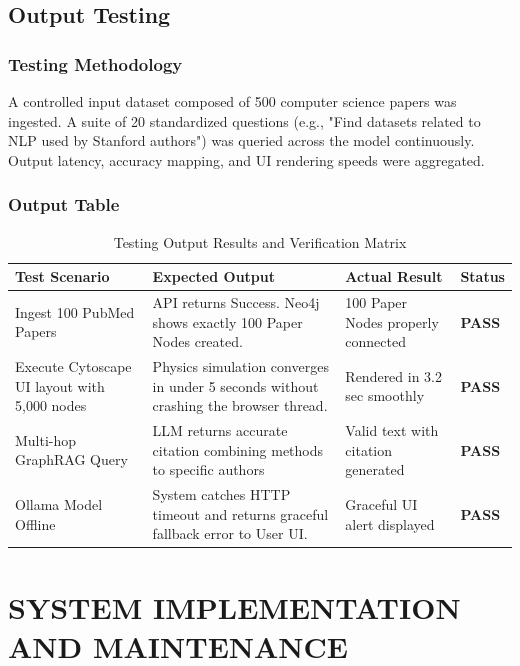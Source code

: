\documentclass[12pt,a4paper]{report}
\begin{document}
\section{Output Testing}

\subsection{Testing Methodology}
A controlled input dataset composed of 500 computer science papers was ingested. A suite of 20 standardized questions (e.g., "Find datasets related to NLP used by Stanford authors") was queried across the model continuously. Output latency, accuracy mapping, and UI rendering speeds were aggregated.

\subsection{Output Table}

\begin{table}[htbp]
	\caption{Testing Output Results and Verification Matrix}
	\begin{center}
		\begin{tabular}{|p{4cm}|p{6cm}|p{3cm}|p{2cm}|}
			\hline
			\textbf{Test Scenario} & \textbf{Expected Output} & \textbf{Actual Result} & \textbf{Status} \\
			\hline
			Ingest 100 PubMed Papers & API returns Success. Neo4j shows exactly 100 Paper Nodes created. & 100 Paper Nodes properly connected & \textbf{PASS} \\
			\hline
            Execute Cytoscape UI layout with 5,000 nodes & Physics simulation converges in under 5 seconds without crashing the browser thread. & Rendered in 3.2 sec smoothly & \textbf{PASS} \\
			\hline
            Multi-hop GraphRAG Query & LLM returns accurate citation combining methods to specific authors & Valid text with citation generated & \textbf{PASS} \\
			\hline
            Ollama Model Offline & System catches HTTP timeout and returns graceful fallback error to User UI. & Graceful UI alert displayed & \textbf{PASS} \\
			\hline
		\end{tabular}
		\label{tab:testing_outputs}
	\end{center}
\end{table}

\chapter{SYSTEM IMPLEMENTATION AND MAINTENANCE}
\noindent{\rule{\textwidth}{1.5pt}}
\end{document}
